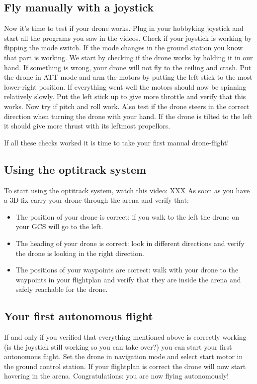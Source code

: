\documentclass{article}
\begin{document}
\subsection*{Fly manually with a joystick }
Now it's time to test if your drone works. Plug in your hobbyking joystick and start all the programs you saw in the videos. 
Check if your joystick is working by flipping the mode switch. If the mode changes in the ground station you know that part is working. 
We start by checking if the drone works by holding it in our hand. If something is wrong, your drone will not fly to the ceiling and crash. 
Put the drone in ATT mode and arm the motors by putting the left stick to the most lower-right position. If everything went well the motors should now be spinning relatively slowly. Put the left stick up to give more throttle and verify that this works. Now try if pitch and roll work. 
Also test if the drone steers in the correct direction when turning the drone with your hand. If the drone is tilted to the left it should give more thrust with its leftmost propellors. 

If all these checks worked it is time to take your first manual drone-flight! 

\subsection*{Using the optitrack system}
To start using the optitrack system, watch this video: XXX
As soon as you have a 3D fix carry your drone through the arena and verify that:
\begin{itemize}
\item The position of your drone is correct: if you walk to the left the drone on your GCS will go to the left.
\item The heading of your drone is correct: look in different directions and verify the drone is looking in the right direction.
\item The positions of your waypoints are correct: walk with your drone to the waypoints in your flightplan and verify that they are inside the arena and safely reachable for the drone. 
\end{itemize}

\subsection*{Your first autonomous flight}
If and only if you verified that everything mentioned above is correctly working (is the joystick still working so you can take over?) you can start your first autonomous flight. 
Set the drone in navigation mode and select start motor in the ground control station. If your flightplan is correct the drone will now start hovering in the arena. Congratulations: you are now flying autonomously!
\end{document}
